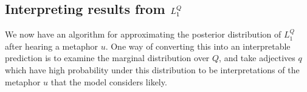 \documentclass[OpenMind]{stjour}
\newcommand{\Listener}{L}
\newcommand{\QLONE}{\Listener_{{1}}^{{Q}}}
\begin{document}


\subsection{Interpreting results from $\protect\QLONE$}

	We now have an algorithm for approximating the posterior distribution of $\QLONE$ after hearing a metaphor $u$. One way of converting this into an interpretable prediction is to examine the marginal distribution over $Q$, and take adjectives $q$ which have high probability under this distribution to be interpretations of the metaphor $u$ that the model considers likely. 




\end{document}
